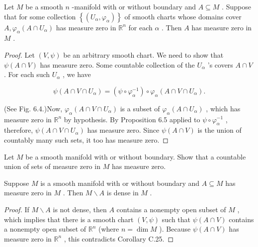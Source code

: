 \begin{lemma}
\label{lem:6-6}
\leanok
{}
Let $M$ be a smooth $n$ -manifold with or without boundary and $A \subseteq  M$ . Suppose that for some collection $\left\{  \left( {{U}_{\alpha },{\varphi }_{\alpha }}\right) \right\}$ of smooth charts whose domains cover $A,{\varphi }_{\alpha }\left( {A \cap  {U}_{\alpha }}\right)$ has measure zero in ${\mathbb{R}}^{n}$ for each $\alpha$ . Then $A$ has measure zero in $M$ .
\end{lemma}

\begin{proof}
\leanok
Let $\left( {V,\psi }\right)$ be an arbitrary smooth chart. We need to show that $\psi \left( {A \cap  V}\right)$ has measure zero. Some countable collection of the ${U}_{\alpha }$ ’s covers $A \cap  V$ . For each such ${U}_{\alpha }$ , we have

\[
\psi \left( {A \cap  V \cap  {U}_{\alpha }}\right)  = \left( {\psi  \circ  {\varphi }_{\alpha }^{-1}}\right)  \circ  {\varphi }_{\alpha }\left( {A \cap  V \cap  {U}_{\alpha }}\right) .
\]

(See Fig. 6.4.)Now, ${\varphi }_{\alpha }\left( {A \cap  V \cap  {U}_{\alpha }}\right)$ is a subset of ${\varphi }_{\alpha }\left( {A \cap  {U}_{\alpha }}\right)$ , which has measure zero in ${\mathbb{R}}^{n}$ by hypothesis. By Proposition 6.5 applied to $\psi  \circ  {\varphi }_{\alpha }^{-1}$ , therefore, $\psi \left( {A \cap  V \cap  {U}_{\alpha }}\right)$ has measure zero. Since $\psi \left( {A \cap  V}\right)$ is the union of countably many such sets, it too has measure zero.
\end{proof}

\begin{exercise}
\label{exer:6-7}
\leanok
{}
Let $M$ be a smooth manifold with or without boundary. Show that a countable union of sets of measure zero in $M$ has measure zero.
\end{exercise}

\begin{proposition}
\label{prop:6-8}
\leanok
{}
Suppose $M$ is a smooth manifold with or without boundary and $A \subseteq  M$ has measure zero in $M$ . Then $M \smallsetminus  A$ is dense in $M$ .
\end{proposition}

\begin{proof}
\leanok
If $M \smallsetminus  A$ is not dense, then $A$ contains a nonempty open subset of $M$ , which implies that there is a smooth chart $\left( {V,\psi }\right)$ such that $\psi \left( {A \cap  V}\right)$ contains a nonempty open subset of ${\mathbb{R}}^{n}$ (where $n = \dim M$ ). Because $\psi \left( {A \cap  V}\right)$ has measure zero in ${\mathbb{R}}^{n}$ , this contradicts Corollary C.25.
\end{proof}

